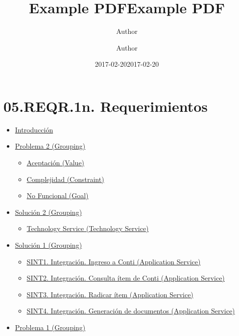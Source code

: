 \documentclass[
  paper=a4,
  ,captions=tableheading
]{scrartcl}
\title{Example PDF}
\author{Author}
\date{2017-02-20}
\title{Example PDF}
\author{Author}
\date{2017-02-20}
\providecommand{\tightlist}{%
  \setlength{\itemsep}{0pt}\setlength{\parskip}{0pt}}
\begin{document}




\hypertarget{reqr.1n.-requerimientos}{%
\section{05.REQR.1n. Requerimientos}\label{reqr.1n.-requerimientos}}

\begin{itemize}
\tightlist
\item
  \protect\hyperlink{Introducciuxf3n}{Introducción}
\item
  \protect\hyperlink{problema-2-grouping}{Problema 2 (Grouping)}

  \begin{itemize}
  \tightlist
  \item
    \protect\hyperlink{aceptaciuxf3n-value}{Aceptación (Value)}
  \item
    \protect\hyperlink{complejidad-constraint}{Complejidad (Constraint)}
  \item
    \protect\hyperlink{no-funcional-goal}{No Funcional (Goal)}
  \end{itemize}
\item
  \protect\hyperlink{soluciuxf3n-2-grouping}{Solución 2 (Grouping)}

  \begin{itemize}
  \tightlist
  \item
    \protect\hyperlink{technology-service-technology-service}{Technology
    Service (Technology Service)}
  \end{itemize}
\item
  \protect\hyperlink{soluciuxf3n-1-grouping}{Solución 1 (Grouping)}

  \begin{itemize}
  \tightlist
  \item
    \protect\hyperlink{sint1.-integraciuxf3n.-ingreso-a-conti-application-service}{SINT1.
    Integración. Ingreso a Conti (Application Service)}
  \item
    \protect\hyperlink{sint2.-integraciuxf3n.-consulta-uxedtem-de-conti-application-service}{SINT2.
    Integración. Consulta ítem de Conti (Application Service)}
  \item
    \protect\hyperlink{sint3.-integraciuxf3n.-radicar-uxedtem-application-service}{SINT3.
    Integración. Radicar ítem (Application Service)}
  \item
    \protect\hyperlink{sint4.-integraciuxf3n.-generaciuxf3n-de-documentos-application-service}{SINT4.
    Integración. Generación de documentos (Application Service)}
  \end{itemize}
\item
  \protect\hyperlink{problema-1-grouping}{Problema 1 (Grouping)}


\end{itemize}
\end{document}
